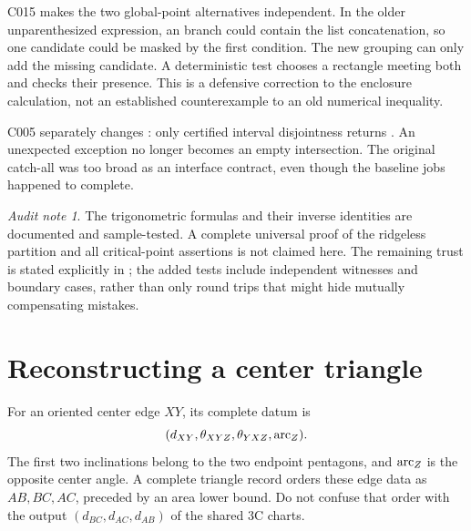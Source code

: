\documentclass[11pt,a4paper]{article}
\newcommand{\code}[1]{\texttt{\detokenize{#1}}}
\theoremstyle{remark}\newtheorem*{contract}{Implementation contract}\newtheorem*{auditnote}{Audit note}
\begin{document}


C015 makes the two global-point alternatives independent. In the older
unparenthesized expression, an \code{else} branch could contain the list
concatenation, so one candidate could be masked by the first condition. The
new grouping can only add the missing candidate. A deterministic test chooses
a rectangle meeting both and checks their presence. This is a defensive
correction to the enclosure calculation, not an established counterexample to
an old numerical inequality.

C005 separately changes \code{someinter_I}: only certified interval
disjointness returns \code{None}. An unexpected exception no longer becomes
an empty intersection. The original catch-all was too broad as an interface
contract, even though the baseline jobs happened to complete.



\begin{auditnote}
The trigonometric formulas and their inverse identities are documented and
sample-tested. A complete universal proof of the ridgeless partition and all
critical-point assertions is not claimed here. The remaining trust is stated
explicitly in \code{AUDIT.md}; the added tests include independent witnesses
and boundary cases, rather than only round trips that might hide mutually
compensating mistakes.
\end{auditnote}

\section{Reconstructing a center triangle}

For an oriented center edge $XY$, its complete datum is
\[
(d_{XY},\theta_{XYZ},\theta_{YXZ},\operatorname{arc}_Z).
\]
The first two inclinations belong to the two endpoint pentagons, and
$\operatorname{arc}_Z$ is the opposite center angle. A complete triangle record orders
these edge data as $AB,BC,AC$, preceded by an area lower bound. Do not confuse
that order with the output $(d_{BC},d_{AC},d_{AB})$ of the shared 3C charts.
\end{document}

